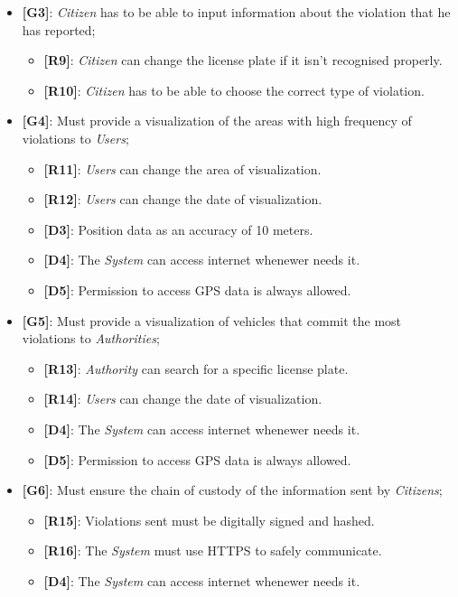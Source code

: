 \documentclass{article}
\begin{document}
\begin{itemize}
    \item \textbf{[G3]}: \textit{Citizen} has to be able to input information about the violation that he has reported;
    \begin{itemize}
        \item \textbf{[R9]}: \textit{Citizen} can change the license plate if it isn't recognised properly.
        \item \textbf{[R10]}: \textit{Citizen} has to be able to choose the correct type of violation.
    \end{itemize}

    \item \textbf{[G4]}: Must provide a visualization of the areas with high frequency of violations to \textit{Users};
    \begin{itemize}
        \item \textbf{[R11]}: \textit{Users} can change the area of visualization.
        \item \textbf{[R12]}: \textit{Users} can change the date of visualization. 
        \item \textbf{[D3]}: Position data as an accuracy of 10 meters.
        \item \textbf{[D4]}: The \textit{System} can access internet whenewer needs it.
        \item \textbf{[D5]}: Permission to access GPS data is always allowed.
    \end{itemize}

    \item \textbf{[G5]}: Must provide a visualization of vehicles that commit the most violations to \textit{Authorities}; 
    \begin{itemize}
        \item \textbf{[R13]}: \textit{Authority} can search for a specific license plate.
        \item \textbf{[R14]}: \textit{Users} can change the date of visualization.
        \item \textbf{[D4]}: The \textit{System} can access internet whenewer needs it.
        \item \textbf{[D5]}: Permission to access GPS data is always allowed.
    \end{itemize}

    \item \textbf{[G6]}: Must ensure the chain of custody of the information sent by \textit{Citizens};
    \begin{itemize}
        \item \textbf{[R15]}: Violations sent must be digitally signed and hashed.
        \item \textbf{[R16]}: The \textit{System} must use HTTPS to safely communicate.
        \item \textbf{[D4]}: The \textit{System} can access internet whenewer needs it.
    \end{itemize}


\end{itemize}
\end{document}
